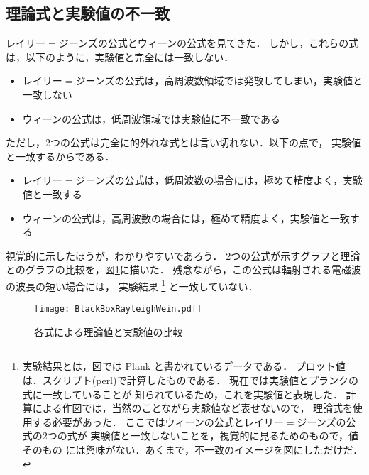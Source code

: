         \subsection{理論式と実験値の不一致}
            レイリー$=$ジーンズの公式とウィーンの公式を見てきた．
            しかし，これらの式は，以下のように，実験値と完全には一致しない．
            \begin{itemize}
                \item レイリー$=$ジーンズの公式は，高周波数領域では発散してしまい，実験値と一致しない
                \item ウィーンの公式は，低周波領域では実験値に不一致である
            \end{itemize}

            ただし，2つの公式は完全に的外れな式とは言い切れない．以下の点で，
            実験値と一致するからである．
            \begin{itemize}
                \item レイリー$=$ジーンズの公式は，低周波数の場合には，極めて精度よく，実験値と一致する
                \item ウィーンの公式は，高周波数の場合には，極めて精度よく，実験値と一致する
            \end{itemize}

            視覚的に示したほうが，わかりやすいであろう．
            2つの公式が示すグラフと理論とのグラフの比較を，図\ref{fig:yu}に描いた．
            残念ながら，この公式は輻射される電磁波の波長の短い場合には，
            実験結果
                \footnote{
                    実験結果とは，図では Plank と書かれているデータである．
                    プロット値は．スクリプト(perl)で計算したものである．
                    現在では実験値とプランクの式に一致していることが
                    知られているため，これを実験値と表現した．
                    計算による作図では，当然のことながら実験値など表せないので，
                    理論式を使用する必要があった．
                    ここではウィーンの公式とレイリー$=$ジーンズの公式の2つの式が
                    実験値と一致しないことを，視覚的に見るためのもので，値そのもの
                    には興味がない．あくまで，不一致のイメージを図にしただけだ．
                }
            と一致していない．
                \begin{figure}[hbt]
                    \begin{center}
                        \texttt{[image: BlackBoxRayleighWein.pdf]}
                        \caption{各式による理論値と実験値の比較}
                        \label{fig:yu}
                    \end{center}
                \end{figure}


